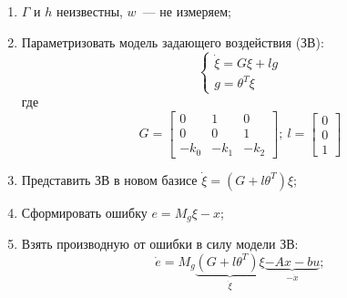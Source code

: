 \begin{enumerate}[1.]
	\item $\Gamma$ и $h$ неизвестны, $w$~--- не измеряем;
	\item Параметризовать модель задающего воздействия (ЗВ):
		\begin{equation}
			\begin{cases}
				\dot{\xi} = G \xi + l g \\
				g = \theta^T \xi
			\end{cases}
		\end{equation}
		где 
		\begin{equation*}
			G = 
			\begin{bmatrix}
				0 & 1 & 0\\
				0 & 0 & 1\\
				-k_0 & -k_1 & -k_2
			\end{bmatrix} \!\!;~
			l = 
			\begin{bmatrix}
				0\\ 0\\ 1
			\end{bmatrix}
		\end{equation*}
	\item Представить ЗВ в новом базисе $\dot{\xi} = (G + l \theta^T) \xi$;
	\item Сформировать ошибку $e = M_g \xi - x$;
	\item Взять производную от ошибки в силу модели ЗВ:
		\begin{equation}
			\dot{e} = M_g \underbrace{(G + l \theta^T) \xi}_{\dot{\xi}} \underbrace{- A x - b u}_{- \dot{x}};
		\end{equation}
		

\end{enumerate}
